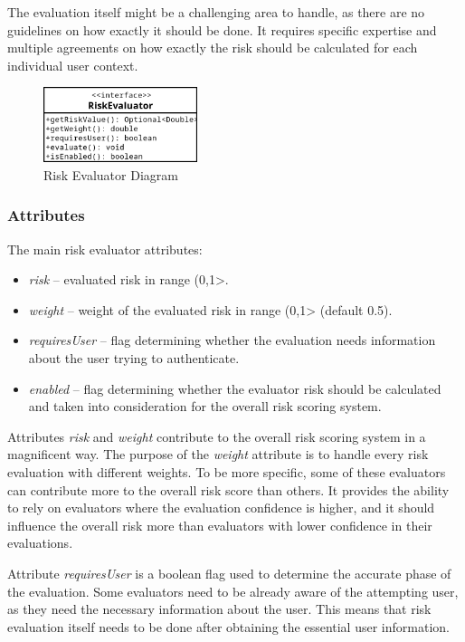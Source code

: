 The evaluation itself might be a challenging area to handle, as there are no guidelines on how exactly it should be done.
It requires specific expertise and multiple agreements on how exactly the risk should be calculated for each individual user context.

\begin{figure}[htbp]
  \centering
  \includegraphics[width=0.4\textwidth]{img/sections/5-design/riskEvaluator.png}
  \caption{Risk Evaluator Diagram}
  \label{fig:design-user-evaluator-diagram}
\end{figure}

\subsubsection{Attributes}
The main risk evaluator attributes:

\begin{itemize}
    \item \textit{risk} -- evaluated risk in range (0,1>.
    \item \textit{weight} -- weight of the evaluated risk in range (0,1> (default 0.5).
    \item \textit{requiresUser} -- flag determining whether the evaluation needs information about the user trying to authenticate. 
    \item \textit{enabled} -- flag determining whether the evaluator risk should be calculated and taken into consideration for the overall risk scoring system. 
\end{itemize}

Attributes \textit{risk} and \textit{weight} contribute to the overall risk scoring system in a magnificent way.
The purpose of the \textit{weight} attribute is to handle every risk evaluation with different weights.
To be more specific, some of these evaluators can contribute more to the overall risk score than others.
It provides the ability to rely on evaluators where the evaluation confidence is higher, and it should influence the overall risk more than evaluators with lower confidence in their evaluations.

Attribute \textit{requiresUser} is a boolean flag used to determine the accurate phase of the evaluation.
Some evaluators need to be already aware of the attempting user, as they need the necessary information about the user.
This means that risk evaluation itself needs to be done after obtaining the essential user information.

